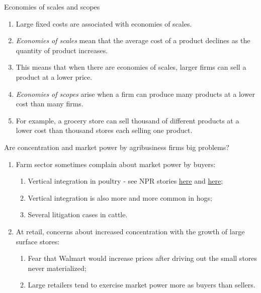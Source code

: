 \documentclass[table,xcolor=pdftex,dvipsnames]{beamer}\usepackage[]{graphicx}\usepackage[]{color}
\begin{document}

\begin{frame}{Economies of scales and scopes}
\begin{enumerate}[label=\textbullet]
  \item Large fixed costs are associated with economies of scales.
  \item \emph{Economies of scales} mean that the average cost of a product declines as the quantity of product increases.
  \item This means that when there are economies of scales, larger firms can sell a product at a lower price.
  \item \emph{Economies of scopes} arise when a firm can produce many products at a lower cost than many firms.
  \item For example, a grocery store can sell thousand of different products at a lower cost than thousand stores each selling one product.
\end{enumerate}
\end{frame}


\begin{frame}{Are concentration and market power by agribusiness firms big problems?}
\begin{enumerate}[label=\textbullet]
  \item Farm sector sometimes complain about market power by buyers:
      \begin{enumerate}[label=-]
          \item Vertical integration in poultry - see NPR stories \href{http://www.npr.org/blogs/thesalt/2014/02/20/279040721/the-system-that-supplies-our-chickens-pits-farmer-against-farmer}{here} and \href{http://www.npr.org/blogs/thesalt/2014/02/19/276981085/is-tyson-foods-chicken-empire-a-meat-racket}{here};
          \item Vertical integration is also more and more common in hogs;
          \item Several litigation cases in cattle.
      \end{enumerate}
      \item At retail, concerns about increased concentration with the growth of large surface stores:
      \begin{enumerate}[label=-]
          \item Fear that Walmart would increase prices after driving out the small stores never materialized;
          \item Large retailers tend to exercise market power more as buyers than sellers.
      \end{enumerate}
\end{enumerate}
\end{frame}
\end{document}
